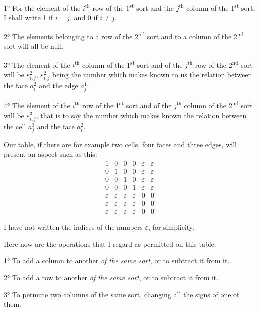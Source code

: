 \documentclass{article}
\begin{document}
1° For the element of the $i^{\text{th}}$ row of the 1\textsuperscript{st} sort and the $j^{\text{th}}$ column of the 1\textsuperscript{st} sort, I shall write 1 if $i = j$, and 0 if $i \neq j$.

2° The elements belonging to a row of the 2\textsuperscript{nd} sort and to a column of the 2\textsuperscript{nd} sort will all be null.

3° The element of the $i^{\text{th}}$ column of the 1\textsuperscript{st} sort and of the $j^{\text{th}}$ row of the 2\textsuperscript{nd} sort will be $\varepsilon^{2}_{i,j}$, $\varepsilon^{2}_{i,j}$ being the number which makes known to us the relation between the face $a^{2}_{i}$ and the edge $a^{1}_{j}$.

4° The element of the $i^{\text{th}}$ row of the 1\textsuperscript{st} sort and of the $j^{\text{th}}$ column of the 2\textsuperscript{nd} sort will be $\varepsilon^{3}_{i,j}$, that is to say the number which makes known the relation between the cell $a^{3}_{j}$ and the face $a^{2}_{i}$.

Our table, if there are for example two cells, four faces and three edges, will present an aspect such as this:
\[ \begin{matrix} 1 & 0 & 0 & 0 & \varepsilon & \varepsilon \\[1ex] 0 & 1 & 0 & 0 & \varepsilon & \varepsilon \\[1ex] 0 & 0 & 1 & 0 & \varepsilon & \varepsilon \\[1ex] 0 & 0 & 0 & 1 & \varepsilon & \varepsilon \\[1ex] \varepsilon & \varepsilon & \varepsilon & \varepsilon & 0 & 0 \\[1ex] \varepsilon & \varepsilon & \varepsilon & \varepsilon & 0 & 0 \\[1ex] \varepsilon & \varepsilon & \varepsilon & \varepsilon & 0 & 0 \end{matrix} \tag{1} \]

I have not written the indices of the numbers $\varepsilon$, for simplicity.

Here now are the operations that I regard as permitted on this table.

1° To add a column to another \emph{of the same sort}, or to subtract it from it.

2° To add a row to another \emph{of the same sort}, or to subtract it from it.

3° To permute two columns of the same sort, changing all the signs of one of them.
\end{document}
